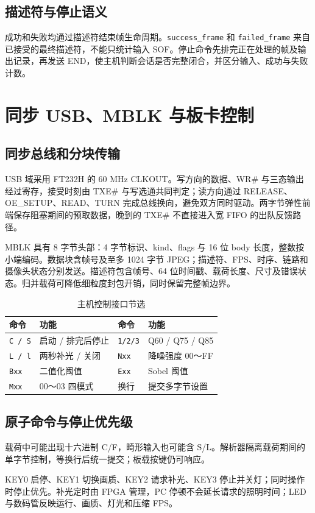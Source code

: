 \subsection{描述符与停止语义}
成功和失败均通过描述符结束帧生命周期。\texttt{success\_frame} 和 \texttt{failed\_frame} 来自已接受的最终描述符，不能只统计输入 SOF。停止命令先排完正在处理的帧及输出记录，再发送 END，使主机判断会话是否完整闭合，并区分输入、成功与失败计数。
\clearpage

\section{同步 USB、MBLK 与板卡控制}
\subsection{同步总线和分块传输}
USB 域采用 FT232H 的 60 MHz CLKOUT。写方向的数据、WR\# 与三态输出经过寄存，接受时刻由 TXE\# 与写选通共同判定；读方向通过 RELEASE、OE\_SETUP、READ、TURN 完成总线换向，避免双方同时驱动。两字节弹性前端保存阻塞期间的预取数据，晚到的 TXE\# 不直接进入宽 FIFO 的出队反馈路径。

MBLK 具有 8 字节头部：4 字节标识、kind、flags 与 16 位 body 长度，整数按小端编码。数据块含帧号及至多 1024 字节 JPEG；描述符、FPS、时序、链路和摄像头状态分别发送。描述符包含帧号、64 位时间戳、载荷长度、尺寸及错误状态。归并载荷可降低细粒度封包开销，同时保留完整帧边界。

\begin{table}[H]\centering\caption{主机控制接口节选}
\small\begin{tabularx}{\linewidth}{@{}lYlY@{}}\toprule
命令 & 功能 & 命令 & 功能\\\midrule
\texttt{C / S} & 启动 / 排完后停止 & \texttt{1/2/3} & Q60 / Q75 / Q85\\
\texttt{L / l} & 两秒补光 / 关闭 & \texttt{Nxx} & 降噪强度 00～FF\\
\texttt{Bxx} & 二值化阈值 & \texttt{Exx} & Sobel 阈值\\
\texttt{Mxx} & 00～03 四模式 & 换行 & 提交多字节设置\\\bottomrule
\end{tabularx}\end{table}

\subsection{原子命令与停止优先级}
载荷中可能出现十六进制 C/F，畸形输入也可能含 S/L。解析器隔离载荷期间的单字节控制，等换行后统一提交；板载按键仍可响应。

KEY0 启停、KEY1 切换画质、KEY2 请求补光、KEY3 停止并关灯；同时操作时停止优先。补光定时由 FPGA 管理，PC 停顿不会延长请求的照明时间；LED 与数码管反映运行、画质、灯光和压缩 FPS。
\clearpage


